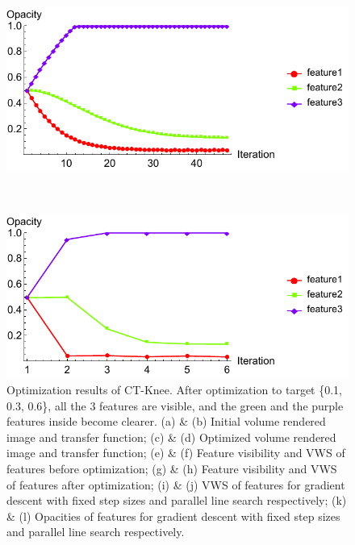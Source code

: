 \begin{figure}
	\begin{minipage}{.49\textwidth}
		\includegraphics[width=1\linewidth]{figures/CT-Knee_naive_opacity_fixed}
		\subcaption{}
	\end{minipage}~
	\begin{minipage}{.49\textwidth}
		\includegraphics[width=1\linewidth]{figures/CT-Knee_naive_opacity_parallelsearch}
		\subcaption{}
	\end{minipage}
	\caption[Optimization results of CT-Knee]{Optimization results of CT-Knee. After optimization to target \{0.1, 0.3, 0.6\}, all the 3 features are visible, and the green and the purple features inside become clearer.
		(a) \& (b) Initial volume rendered image and transfer function; (c) \& (d) Optimized volume rendered image and transfer function; (e) \& (f) Feature visibility and VWS of features before optimization; (g) \& (h) Feature visibility and VWS of features after optimization; (i) \& (j) VWS of features for gradient descent with fixed step sizes and parallel line search respectively; (k) \& (l) Opacities of features for gradient descent with fixed step sizes and parallel line search respectively.}
	\label{fig:CT-Knee_naive_optimized}
\end{figure}


